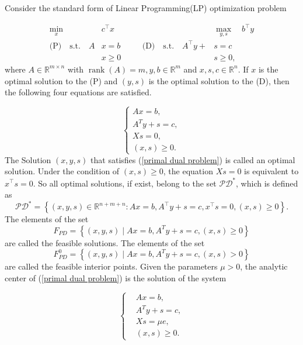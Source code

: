 Consider the standard form of Linear Programming(LP) optimization problem

\begin{equation}\label{primal dual problem}
\begin{aligned}
 \min_{x} \quad &c^{\top} x && \quad &\max_{y, s} \quad b^{\top} y \\
 \text{(P)} \quad \text{s.t.} \quad A &x = b && \quad \text{(D)} \quad \text{s.t.} \quad A^{\top} y+&s = c \\
 &x  \geq 0  && &s \geq 0,
\end{aligned}
\end{equation}
where $A \in \mathbb{R}^{m \times n}$ with $\operatorname{rank}(A)=m, y, b \in \mathbb{R}^m$ and $x, s, c \in \mathbb{R}^n$. If $x$ is the optimal solution to the (P) and $(y, s)$ is the optimal solution to the (D), then the following four equations are satisfied.

\begin{equation}
    \left\{\begin{array}{l}
A x=b, \\
A^T y+s=c, \\
X s=0, \\
(x, s) \geq 0.
\end{array}\right.
\end{equation}
The Solution $(x, y, s)$ that satisfies (\ref{primal dual problem}) is called an optimal solution. Under the condition of $(x, s) \geq 0$, the equation $Xs = 0$ is equivalent to $x^{\top}s = 0$. So all optimal solutions, if exist, belong to the set $\mathcal{P} \mathcal{D}^*$, which is defined as
\begin{equation}
    \mathcal{PD}^*=\left\{(x, y, s) \in \mathbb{R}^{n+m+n}: A x=b, A^{\top} y+s=c, x^{\top} s=0,(x, s) \geq 0\right\}.
\end{equation}
The elements of the set 
\begin{equation}
    F_{P D}=\left\{(x, y, s) \mid A x=b, A^T y+s=c, (x,s) \geq 0 \right\}
\end{equation}
are called the feasible solutions. The elements of the set 
\begin{equation}
    F_{P D}^0=\left\{(x, y, s) \mid A x=b, A^T y+s=c, (x,s) > 0 \right\}
\end{equation}
are called the feasible interior points. Given the parameters $\mu>0$, the analytic center of (\ref{primal dual problem}) is the solution of the system

\begin{equation}\label{center path system}
    \left\{
    \begin{aligned}
        & A x=b, \\
        & A^T y+s=c, \\
        & X s=\mu e ,\\
        & (x,s) \geq 0.
    \end{aligned}
    \right.
\end{equation}

